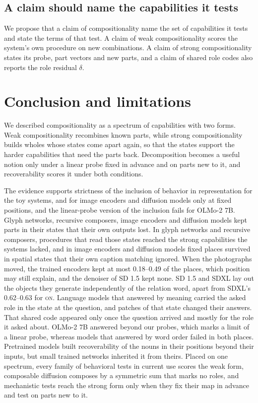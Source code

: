 \documentclass[10pt]{article}
\theoremstyle{plain}
\theoremstyle{remark}
\begin{document}
\subsection{A claim should name the capabilities it tests}
\label{sec:claims}

We propose that a claim of compositionality name the set of capabilities it tests and state the terms of that test. A claim of weak compositionality scores the system's own procedure on new combinations. A claim of strong compositionality states its probe, part vectors and new parts, and a claim of shared role codes also reports the role residual $\delta$.


\section{Conclusion and limitations}
\label{sec:discussion}

We described compositionality as a spectrum of capabilities with two forms. Weak compositionality recombines known parts, while strong compositionality builds wholes whose states come apart again, so that the states support the harder capabilities that need the parts back. Decomposition becomes a useful notion only under a linear probe fixed in advance and on parts new to it, and recoverability scores it under both conditions.

The evidence supports strictness of the inclusion of behavior in representation for the toy systems, and for image encoders and diffusion models only at fixed positions, and the linear-probe version of the inclusion fails for OLMo-2 7B. Glyph networks, recursive composers, image encoders and diffusion models kept parts in their states that their own outputs lost. In glyph networks and recursive composers, procedures that read those states reached the strong capabilities the systems lacked, and in image encoders and diffusion models fixed places survived in spatial states that their own caption matching ignored. When the photographs moved, the trained encoders kept at most 0.18--0.49 of the places, which position may still explain, and the denoiser of SD 1.5 kept none. SD 1.5 and SDXL lay out the objects they generate independently of the relation word, apart from SDXL's 0.62--0.63 for \textsc{on}. Language models that answered by meaning carried the asked role in the state at the question, and patches of that state changed their answers. That shared code appeared only once the question arrived and mostly for the role it asked about. OLMo-2 7B answered beyond our probes, which marks a limit of a linear probe, whereas models that answered by word order failed in both places. Pretrained models built recoverability of the nouns in their positions beyond their inputs, but small trained networks inherited it from theirs. Placed on one spectrum, every family of behavioral tests in current use scores the weak form, composable diffusion composes by a symmetric sum that marks no roles, and mechanistic tests reach the strong form only when they fix their map in advance and test on parts new to it.
\end{document}
